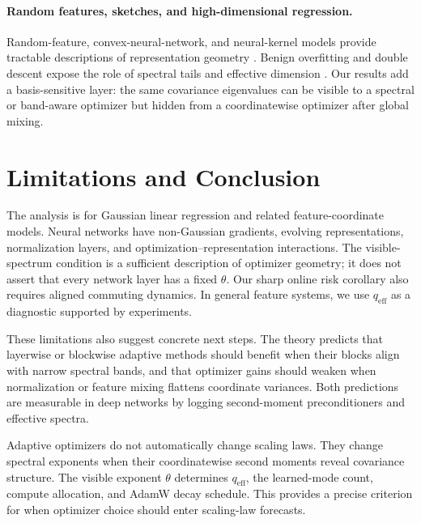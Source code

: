 \documentclass[letterpaper]{article} %
\newcommand{\qeff}{q_{\mathrm{eff}}}
\begin{document}
\paragraph{Random features, sketches, and high-dimensional regression.}
Random-feature, convex-neural-network, and neural-kernel models provide tractable descriptions of representation geometry
\cite{rahimi2007random,rudi2017generalization,bach2017breaking,jacot2018neural}.
Benign overfitting and double descent expose the role of spectral tails and effective dimension
\cite{belkin2019reconciling,bartlett2020benign,hastie2022surprises}.
Our results add a basis-sensitive layer: the same covariance eigenvalues can be visible to a spectral or band-aware optimizer but hidden from a coordinatewise optimizer after global mixing.

\section{Limitations and Conclusion}

The analysis is for Gaussian linear regression and related feature-coordinate models.  Neural networks have non-Gaussian gradients, evolving representations, normalization layers, and optimization--representation interactions.  The visible-spectrum condition is a sufficient description of optimizer geometry; it does not assert that every network layer has a fixed $\theta$.  Our sharp online risk corollary also requires aligned commuting dynamics.  In general feature systems, we use $\qeff$ as a diagnostic supported by experiments.

These limitations also suggest concrete next steps.  The theory predicts that layerwise or blockwise adaptive methods should benefit when their blocks align with narrow spectral bands, and that optimizer gains should weaken when normalization or feature mixing flattens coordinate variances.  Both predictions are measurable in deep networks by logging second-moment preconditioners and effective spectra.

Adaptive optimizers do not automatically change scaling laws.  They change spectral exponents when their coordinatewise second moments reveal covariance structure.  The visible exponent $\theta$ determines $\qeff$, the learned-mode count, compute allocation, and AdamW decay schedule.  This provides a precise criterion for when optimizer choice should enter scaling-law forecasts.


\end{document}
